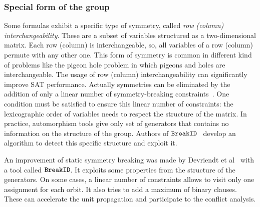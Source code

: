 %


\subsubsection{Special form of the group} \label{sec:matrix-sbp}

Some formulas exhibit a specific type of symmetry, called \emph{row (column) interchangeability}. These are
a subset of variables structured as a two-dimensional matrix. Each row (column) is interchangeable,
so, all variables of a row (column) permute with any other one.
This form of symmetry is common in different kind of problems like the pigeon hole problem in which
pigeons and holes are interchangeable.%
The usage of row (column) interchangeability can significantly improve SAT performance. 
Actually symmetries can be eliminated by the addition 
of only a linear number of symmetry-breaking constraints~\cite{flener2002breaking}. 
One condition must be satisfied to ensure this linear number of constraints:
the lexicographic order of variables needs to respect the structure of the matrix.
In practice, automorphism tools give only  set of generators that contains no information on
the structure of the group. 
Authors of $\texttt{BreakID}$~\cite{devriendt2016improved} develop an algorithm to detect this specific 
structure and exploit it.

An improvement of static symmetry breaking was made by Devriendt et al~\cite{devriendt2016improved} with a tool 
called $\texttt{BreakID}$. It exploits some properties from the structure of the generators. On some cases, 
a linear number of constraints allows to visit only one assignment for each orbit.
 It also tries to add a maximum of binary clauses.
 These can accelerate the unit propagation and participate to the conflict analysis.

